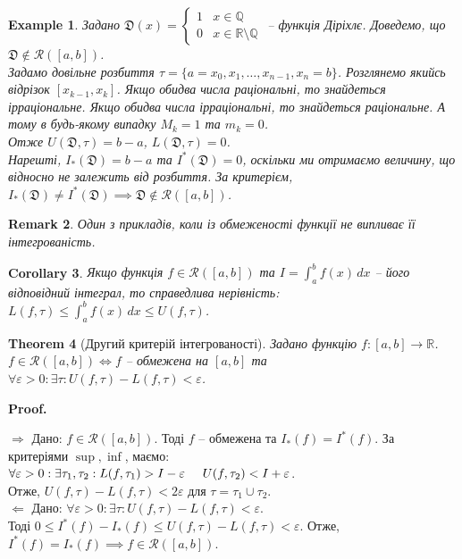 \documentclass[a4paper, 10pt]{article}
\makeatletter
\def\huge{\displaystyle}
\def\qed{$\blacksquare$}
\def\rightproof{$\boxed{\Rightarrow}$ }
\def\leftproof{$\boxed{\Leftarrow}$ }
\theoremstyle{theoremdd}
\newtheorem{theorem}{Theorem}[subsection]
\theoremstyle{theoremdd}
\theoremstyle{theoremdd}
\theoremstyle{theoremdd}
\theoremstyle{theoremdd}
\newtheorem{example}[theorem]{Example}
\theoremstyle{theoremdd}
\theoremstyle{theoremdd}
\newtheorem{remark}[theorem]{Remark}
\theoremstyle{theoremdd}
\theoremstyle{theoremdd}
\newtheorem{corollary}[theorem]{Corollary}
\renewenvironment{proof}[1][Proof.\\]{\par
\pushQED{\hfill \qed}%
\normalfont \topsep6\p@\@plus6\p@\relax
\trivlist
\item\relax
{\bfseries
#1\@addpunct{.}}\hspace\labelsep\ignorespaces
}{%
\popQED\endtrivlist\@endpefalse
}
\makeatother
\begin{document}
\begin{example}
Задано $\mathfrak{D}(x) = \begin{cases} 1 & x \in \mathbb{Q} \\ 0 & x \in \mathbb{R} \setminus \mathbb{Q} \end{cases}$ -- функція Діріхлє. Доведемо, що $\mathfrak{D} \notin \mathcal{R}([a,b])$.\\
Задамо довільне розбиття $\tau = \{a = x_0,x_1,\dots,x_{n-1},x_n = b\}$. Розглянемо якийсь відрізок $[x_{k-1},x_k]$. Якщо обидва числа раціональні, то знайдеться ірраціональне. Якщо обидва числа ірраціональні, то знайдеться раціональне. А тому в будь-якому випадку $M_k =1$ та $m_k = 0$.\\
Отже $U(\mathfrak{D},\tau) = b-a$, \hspace{1cm} $L(\mathfrak{D},\tau) = 0$.\\
Нарешті, $I_*(\mathfrak{D}) = b-a$ та $I^*(\mathfrak{D}) = 0$, оскільки ми отримаємо величину, що відносно не залежить від розбиття. За критерієм, $I_*(\mathfrak{D}) \neq I^*(\mathfrak{D}) \implies \mathfrak{D} \not\in \mathcal{R}([a,b])$.
\end{example}

\begin{remark}
Один з прикладів, коли із обмеженості функції не випливає її інтегрованість.
\end{remark}

\begin{corollary}
Якщо функція $f \in \mathcal{R}([a,b])$ та $I = \huge\int_a^b f(x)\,dx$ -- його відповідний інтеграл, то справедлива нерівність: $L(f,\tau) \leq \huge\int_a^b f(x)\,dx \leq U(f, \tau)$.
\end{corollary}

\begin{theorem}[Другий критерій інтегрованості]
Задано функцію $f \colon [a,b] \to \mathbb{R}$.\\
$f \in \mathcal{R}([a,b]) \iff f$ -- обмежена на $[a,b]$ та $\forall \varepsilon > 0: \exists \tau: U(f,\tau) - L(f,\tau) < \varepsilon$.
\end{theorem}

\begin{proof}
\rightproof Дано: $f \in \mathcal{R}([a,b])$. Тоді $f$ -- обмежена та $I_*(f)=I^*(f)$. За критеріями $\sup,\inf$, маємо:\\
$\forall \varepsilon > 0: \exists \tau_1,\tau_2: L(f,\tau_1) > I - \varepsilon \hspace{0.5cm} U(f,\tau_2) < I + \varepsilon$.\\
Отже, $U(f,\tau) - L(f,\tau) < 2\varepsilon$ для $\tau = \tau_1 \cup \tau_2$.
\bigskip \\
\leftproof Дано: $\forall \varepsilon > 0: \exists \tau: U(f, \tau) - L(f,\tau) < \varepsilon$.\\
Тоді $0 \leq I^*(f) - I_*(f) \leq U(f, \tau) - L(f,\tau) < \varepsilon$. Отже, $I^*(f) = I_*(f) \implies f \in \mathcal{R}([a,b])$.
\end{proof}
\end{document}
